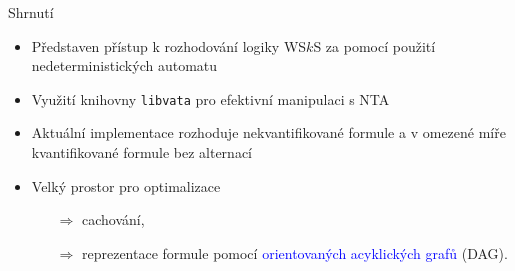 \documentclass{beamer}
\begin{document}
  \begin{frame}{Shrnutí}
  \begin{itemize}
    \item Představen přístup k rozhodování logiky WS$k$S za pomocí použití
    nedeterministických automatu
      \pause
    \item Využití knihovny \texttt{libvata} pro efektivní manipulaci s NTA
      \pause
    \item Aktuální implementace rozhoduje nekvantifikované formule a v omezené
    míře kvantifikované formule bez alternací
      \pause
    \item Velký prostor pro optimalizace
    \begin{itemize}
      \item[$\Rightarrow$]cachování,
      \item[$\Rightarrow$]reprezentace formule pomocí
	    \textcolor{blue}{orientovaných acyklických grafů} (DAG).
    \end{itemize}
  \end{itemize}
  \end{frame}
\end{document}
